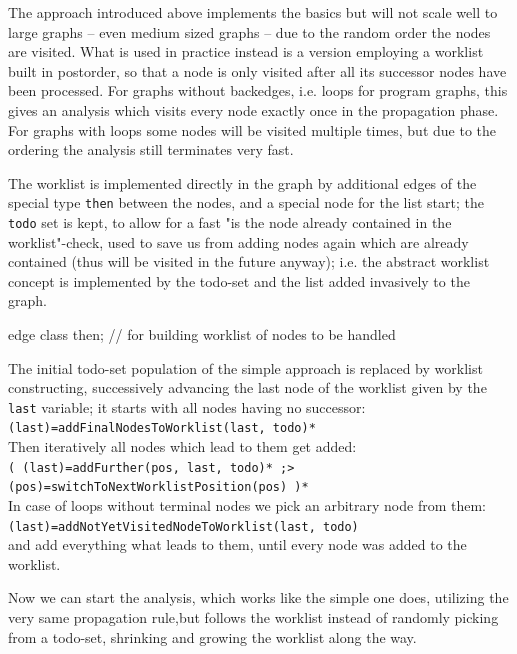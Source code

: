 The approach introduced above implements the basics but will not scale well to large graphs -- even medium sized graphs -- due to the random order the nodes are visited.
What is used in practice instead is a version employing a worklist built in postorder, so that a node is only visited after all its successor nodes have been processed.
For graphs without backedges, i.e. loops for program graphs, this gives an analysis which visits every node exactly once in the propagation phase.
For graphs with loops some nodes will be visited multiple times, but due to the ordering the analysis still terminates very fast.

The worklist is implemented directly in the graph by additional edges of the special type \verb#then# between the nodes, and a special node for the list start; the \verb#todo# set is kept, to allow for a fast "is the node already contained in the worklist"-check, used to save us from adding nodes again which are already contained (thus will be visited in the future anyway); i.e. the abstract worklist concept is implemented by the todo-set and the list added invasively to the graph.

  \begin{example}
    \begin{grgen}
edge class then; // for building worklist of nodes to be handled
    \end{grgen}
  \end{example}

\noindent The initial todo-set population of the simple approach is replaced by worklist constructing, successively advancing the last node of the worklist given by the \verb#last# variable; it starts with all nodes having no successor:\\
\verb#(last)=addFinalNodesToWorklist(last, todo)*#\\
Then iteratively all nodes which lead to them get added:\\
\verb#( (last)=addFurther(pos, last, todo)* ;> (pos)=switchToNextWorklistPosition(pos) )*#\\
In case of loops without terminal nodes we pick an arbitrary node from them:\\ \verb#(last)=addNotYetVisitedNodeToWorklist(last, todo)#\\
and add everything what leads to them, until every node was added to the worklist.

Now we can start the analysis, which works like the simple one does, utilizing the very same propagation rule,but follows the worklist instead of randomly picking from a todo-set, shrinking and growing the worklist along the way.

